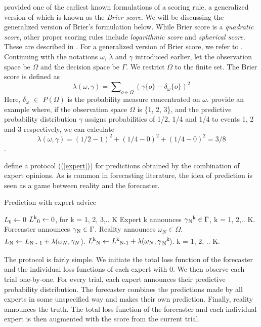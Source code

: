 \documentclass{article}
\begin{document}
\cite{brier1950verification} provided one of the earliest known formulations of a scoring rule, a generalized version of which is known as the \textit{Brier score}. We will be discussing the generalized version of Brier's formulation below. While Brier score is a \textit{quadratic score}, other proper scoring rules include \textit{logarithmic score} and \textit{spherical score}. These are described in \cite{gneiting2007strictly}. For a generalized version of Brier score, we refer to \cite{vovk2009prediction}. Continuing with the notations $\omega$, $\lambda$ and $\gamma$ introduced earlier, let the observation space be $\Omega$ and the decision space be $\Gamma$. We restrict $\Omega$ to the finite set. The Brier score is defined as \
\[ \lambda (\omega, \gamma) = \sum\nolimits_{o \in \Omega} (\gamma \{ o\} - \delta_\omega\{o\})^2\]
Here, $\delta_\omega$ $\in$ $P(\Omega)$ is the probability measure concentrated on $\omega$. \cite{vovk2009prediction} provide an example where, if the observation space $\Omega$ is \{1, 2, 3\}, and the predictive probability distribution $\gamma$ assigns probabilities of 1/2, 1/4 and 1/4 to events 1, 2 and 3 respectively, we can calculate
\[ \lambda (\omega, \gamma) = (1/2 - 1)^2 + (1/4 - 0)^2 + (1/4 - 0)^2 = 3/8\].

\cite{vovk2009prediction} define a protocol ((\ref{expert})) for predictions obtained by the combination of expert opinions. As is common in forecasting literature, the idea of prediction is seen as a game between reality and the forecaster.

\begin{algorithm}
\caption{Prediction with expert advice}\label{expert}
\begin{algorithmic}
\State $L_0 \leftarrow 0$
\State $L\textsuperscript{k}\textsubscript{0} \leftarrow 0$, for k = 1, 2, 3,.. K
\For{N = 1, 2, ...}
	\State Expert k announces $\gamma\textsubscript{N}\textsuperscript{k} \in \Gamma$, k = 1, 2,.. K.
	\State Forecaster announces $\gamma\textsubscript{N} \in \Gamma$.
	\State Reality announces $\omega_N \in \Omega$.
	\State $L\textsubscript{N} \leftarrow L\textsubscript{N - 1} +  \lambda (\omega_N, \gamma_N$).
	\State $L\textsuperscript{k}\textsubscript{N} \leftarrow L\textsuperscript{k}\textsubscript{N-1} +  \lambda (\omega_N, \gamma$\textsubscript{N}\textsuperscript{k}). k = 1, 2, .. K.
\EndFor
\end{algorithmic}
\end{algorithm}

The protocol is fairly simple. We initiate the total loss function of the forecaster and the individual loss functions of each expert with 0. We then observe each trial one-by-one. For every trial, each expert announces their predictive probability distribution. The forecaster combines the predictions made by all experts in some unspecified way and makes their own prediction. Finally, reality announces the truth. The total loss function of the forecaster and each individual expert is then augmented with the score from the current trial.
\end{document}
